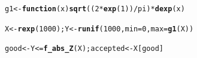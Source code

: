 \documentclass[11pt, a4paper]{article}\usepackage[]{graphicx}\usepackage[]{xcolor}
\makeatletter
\newcommand{\hlnum}[1]{\textcolor[rgb]{0.686,0.059,0.569}{#1}}%
\newcommand{\hlopt}[1]{\textcolor[rgb]{0,0,0}{#1}}%
\newcommand{\hldef}[1]{\textcolor[rgb]{0.345,0.345,0.345}{#1}}%
\newcommand{\hlkwa}[1]{\textcolor[rgb]{0.161,0.373,0.58}{\textbf{#1}}}%
\newcommand{\hlkwb}[1]{\textcolor[rgb]{0.69,0.353,0.396}{#1}}%
\newcommand{\hlkwc}[1]{\textcolor[rgb]{0.333,0.667,0.333}{#1}}%
\newcommand{\hlkwd}[1]{\textcolor[rgb]{0.737,0.353,0.396}{\textbf{#1}}}%
\newenvironment{kframe}{%
 \def\at@end@of@kframe{}%
 \ifinner\ifhmode%
  \def\at@end@of@kframe{\end{minipage}}%
  \begin{minipage}{\columnwidth}%
 \fi\fi%
 \def\FrameCommand##1{\hskip\@totalleftmargin \hskip-\fboxsep
 \colorbox{shadecolor}{##1}\hskip-\fboxsep
     \hskip-\linewidth \hskip-\@totalleftmargin \hskip\columnwidth}%
 \MakeFramed {\advance\hsize-\width
   \@totalleftmargin\z@ \linewidth\hsize
   \@setminipage}}%
 {\par\unskip\endMakeFramed%
 \at@end@of@kframe}
\newenvironment{knitrout}{}{} %
\makeatother
\begin{document}
\begin{knitrout}
\color{fgcolor}\begin{kframe}
\begin{alltt}
\hldef{g1} \hlkwb{<-} \hlkwa{function}\hldef{(}\hlkwc{x}\hldef{)} \hlkwd{sqrt}\hldef{((}\hlnum{2} \hlopt{*} \hlkwd{exp}\hldef{(}\hlnum{1}\hldef{))} \hlopt{/} \hldef{pi)} \hlopt{*} \hlkwd{dexp}\hldef{(x)}
\end{alltt}
\end{kframe}
\end{knitrout}

\begin{knitrout}
\color{fgcolor}\begin{kframe}
\begin{alltt}
\hldef{X} \hlkwb{<-} \hlkwd{rexp}\hldef{(}\hlnum{1000}\hldef{); Y} \hlkwb{<-} \hlkwd{runif}\hldef{(}\hlnum{1000}\hldef{,} \hlkwc{min} \hldef{=} \hlnum{0}\hldef{,} \hlkwc{max} \hldef{=} \hlkwd{g1}\hldef{(X))}
\end{alltt}
\end{kframe}
\end{knitrout}

\begin{knitrout}
\color{fgcolor}\begin{kframe}
\begin{alltt}
\hldef{good} \hlkwb{<-} \hldef{Y} \hlopt{<=} \hlkwd{f_abs_Z}\hldef{(X); accepted} \hlkwb{<-} \hldef{X[good]}
\end{alltt}
\end{kframe}
\end{knitrout}



\newpage
\end{document}
